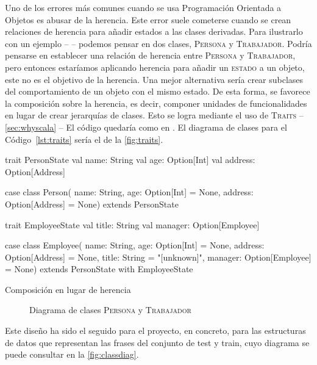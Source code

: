 Uno de los errores más comunes cuando se usa Programación Orientada a Objetos es
abusar de la herencia. Este error suele cometerse cuando se crean relaciones de
herencia para añadir estados a las clases derivadas. Para ilustrarlo con un
ejemplo -- \citet{Dean2015} -- podemos pensar en dos clases, \textsc{Persona} y
\textsc{Trabajador}. Podría pensarse en establecer una relación de herencia
entre \textsc{Persona} y \textsc{Trabajador}, pero entonces estaríamos aplicando
herencia para añadir un \textsc{estado} a un objeto, este no es el objetivo de
la herencia. Una mejor alternativa sería crear subclases del comportamiento de
un objeto con el mismo estado. De esta forma, se favorece la composición sobre
la herencia, es decir, componer unidades de funcionalidades en lugar de crear
jerarquías de clases. Esto se logra mediante el uso de \textsc{Traits} --
\autoref{sec:whyscala} -- El código quedaría como en . El
diagrama de clases para el Código~\ref{lst:traits} sería el de la
\autoref{fig:traits}.
\begin{listing}[H]
  \begin{scalacode}
    trait PersonState {
      val name: String
      val age: Option[Int]
      val address: Option[Address]
    }

    case class Person(
      name: String,
      age: Option[Int] = None,
      address: Option[Address] = None) extends PersonState

    trait EmployeeState {
      val title: String
      val manager: Option[Employee]
    }

    case class Employee(
      name: String,
      age: Option[Int] = None,        
      address: Option[Address] = None,
      title: String = "[unknown]",
      manager: Option[Employee] = None)
    extends PersonState with EmployeeState
  \end{scalacode}
  \caption{Composición en lugar de herencia}
  \label{lst:traits}
\end{listing}
\begin{figure}[ht]
  \centering
  \caption{Diagrama de clases \textsc{Persona} y \textsc{Trabajador}}
  \label{fig:traits}
\end{figure}
Este diseño ha sido el seguido para el proyecto, en concreto, para las
estructuras de datos que representan las frases del conjunto de test y train,
cuyo diagrama se puede consultar en la \autoref{fig:classdiag}.


